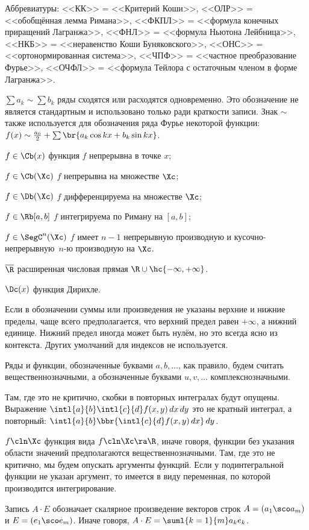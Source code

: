 \documentclass[a4paper]{article}
\newcommand{\intlab}{\intl{a}{b}}
\begin{document}
\begin{points}{-3}
\item Аббревиатуры: <<КК>> = <<Критерий Коши>>, <<ОЛР>> = <<обобщённая лемма
      Римана>>, <<ФКПЛ>> = <<формула конечных приращений Лагранжа>>, <<ФНЛ>> = <<формула Ньютона
      Лейбница>>, <<НКБ>> = <<неравенство Коши Буняковского>>, <<ОНС>> = <<ортонормированная система>>,
      <<ЧПФ>> = <<частное преобразование Фурье>>, <<ОЧФЛ>> = <<формула Тейлора с остаточным членом в
      форме Лагранжа>>.
\item $\sum a_k \sim \sum b_k$ ряды сходятся или расходятся одновременно. Это обозначение не является
      стандартным и использовано только ради краткости записи. Знак $\sim$ также
      используется для обозначения ряда Фурье некоторой функции:
      $f(x) \sim \frac{a_0}{2} + \sum \br{a_k\cos kx + b_k\sin kx}$.
\item \begin{items}{-3}
      \item $f \in\Cb(x)$ функция $f$ непрерывна в точке $x$;
      \item $f \in\Cb(\Xc)$ $f$ непрерывна на множестве $\Xc$;
      \item $f \in\Db(\Xc)$ $f$ дифференцируема на множестве $\Xc$;
      \item $f \in\Rb[a,b]$ $f$ интегрируема по Риману на $[a,b]$;
      \item $f\in\SegC^n(\Xc)$ $f$ имеет $n-1$ непрерывную производную и кусочно-непрерывную~$n$-ю
            производную на $\Xc$.
      \end{items}
\item $\overline{\R}$ расширенная числовая прямая $\R \cup \hc{-\infty, +\infty}$.
\item $\Dc(x)$ функция Дирихле.
\item Если в обозначении суммы или произведения не указаны верхние и нижние пределы, чаще всего предполагается,
      что верхний предел равен $+\infty$, а нижний единице. Нижний предел иногда может быть нулём,
      но это всегда ясно из контекста. Других умолчаний для индексов не используется.
\item Ряды и функции, обозначенные буквами $a,b,\dots$, как правило, будем считать вещественнозначными,
      а обозначенные буквами $u,v,\dots$ комплекснозначными.
\item Там, где это не критично, скобки в повторных интегралах будут опущены.
      Выражение $\intlab \intl{c}{d}f(x,y)\,d x \,d y$ это не кратный интеграл, а повторный:
      $\intlab \bbr{\intl{c}{d}f(x,y)\,d x}\,d y$.
\item $f\cln \Xc$ функция вида $f\cln\Xc\ra\R$, иначе говоря, функции без указания области значений
      предполагаются вещественнозначными. Там, где это не критично,
      мы будем опускать аргументы функций. Если у подинтегральной функции не указан аргумент,
      то имеется в виду переменная, по которой производится интегрирование.
\item Запись $A \cdot E$ обозначает скалярное произведение векторов строк $A = (a_1\sco a_m)$ и $E = (e_1\sco e_m)$.
      Иначе говоря, $A\cdot E = \suml{k=1}{m} a_k e_k$.
\end{points}
\end{document}

